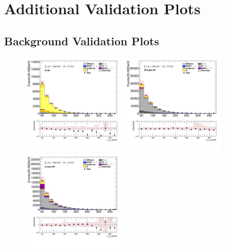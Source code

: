 \chapter{Additional Validation Plots}\label{app:valid-plots}

	\clearpage
	\section{\taujets Background Validation Plots}\label{sec:taujet-valid-plots}
		\clearpage

		\begin{figure}[!htp]
			\begin{center}    
			\includegraphics[width=0.45\textwidth]{chapters/chapter6_HPlus/images/taujets/tau_0_pt_TTBAR.png}
			\includegraphics[width=0.45\textwidth]{chapters/chapter6_HPlus/images/taujets/tau_0_pt_WJETS.png} \\
			\includegraphics[width=0.45\textwidth]{chapters/chapter6_HPlus/images/taujets/tau_0_pt_BVETO.png}

\end{center}
\end{figure}
